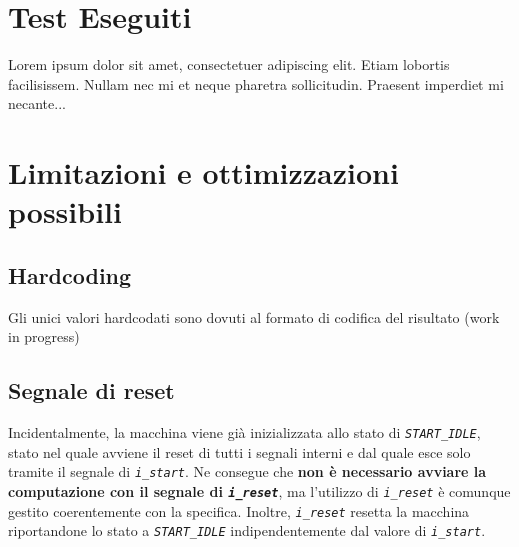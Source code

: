 \documentclass[12pt,a4paper,titlepage]{article}
\begin{document}
	\section{Test Eseguiti}
       
		Lorem ipsum dolor sit amet, consectetuer adipiscing elit.  
		Etiam lobortis facilisissem.  Nullam nec mi et neque pharetra 
		sollicitudin.  Praesent imperdiet mi necante...
	\section{Limitazioni e ottimizzazioni possibili}
		\subsection{Hardcoding}
			Gli unici valori hardcodati sono dovuti al formato di codifica del risultato (work in progress)
		\subsection{Segnale di reset}
			Incidentalmente, la macchina viene già inizializzata allo stato di \textit{\texttt{START\_IDLE}}, stato nel quale avviene il reset di tutti i segnali interni e dal quale esce solo tramite il segnale di \textit{\texttt{i\_start}}.
			Ne consegue che \textbf{non è necessario avviare la computazione con il segnale di \textit{\texttt{i\_reset}}}, ma l'utilizzo di \textit{\texttt{i\_reset}} è comunque gestito coerentemente con la specifica. Inoltre, \textit{\texttt{i\_reset}} resetta la macchina riportandone lo stato a \textit{\texttt{START\_IDLE}} indipendentemente dal valore di \textit{\texttt{i\_start}}.
\end{document}
